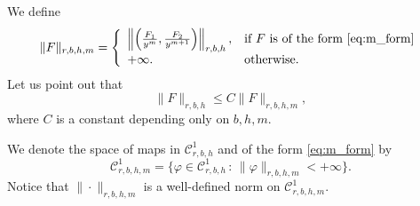 \documentclass[10pt]{article}
\newcommand{\C}{\mathbb{C}}
\newcommand{\T}{\mathbb{T}}
\newcommand{\Domain}[3]{D_{#1, #2, #3}}
\begin{document}


We define 
\[
\|F\|_{r,b,h,m} = \left\{  \begin{array}{ll} \left\|\left(\tfrac{F_1}{y^m}, \tfrac{F_2}{y^{m + 1}} \right)\right\|_{r,b,h}, & \text{if $F$ is of the form }  \eqref{eq:m_form}\\
+\infty. & \text{otherwise}. \end{array}\right.
\]
Let us point out that
\[ \| F\|_{r, b, h} \leq C \| F\|_{r, b, h, m},\]
where $C$ is a constant depending only on $b, h, m$.

We denote the space of maps in $\mathscr C^1_{r,b,h}$ and of the form \eqref{eq:m_form} by %
\[
\mathscr C^1_{r,b,h,m} = \{ \varphi \in \mathscr C^1_{r,b,h}\,:\, \|\varphi\|_{r,b,h,m}<+\infty\}.
\]
Notice that $\| \cdot \|_{r,b,h,m}$ is a well-defined norm on $\mathscr C^1_{r,b,h,m}$.
\end{document}
